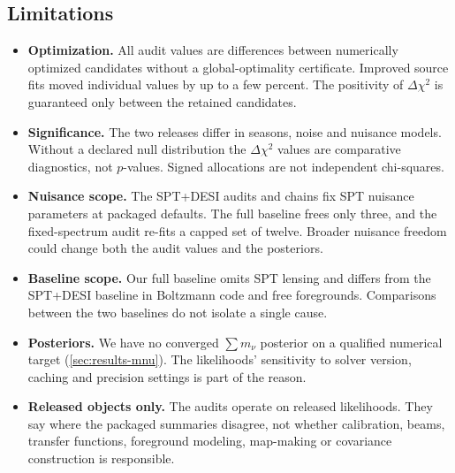 \documentclass[11pt]{article}
\theoremstyle{remark}
\newcommand{\dchi}{\Delta \chi^2}
\newcommand{\mnu}{\sum m_\nu}
\numberwithin{equation}{section}
\begin{document}
\subsection{Limitations}
\begin{itemize}[leftmargin=*, itemsep=2pt]
  \item \textbf{Optimization.} All audit values are differences between numerically optimized candidates without a global-optimality certificate. Improved source fits moved individual values by up to a few percent. The positivity of $\dchi$ is guaranteed only between the retained candidates.
  \item \textbf{Significance.} The two releases differ in seasons, noise and nuisance models. Without a declared null distribution the $\dchi$ values are comparative diagnostics, not $p$-values. Signed allocations are not independent chi-squares.
  \item \textbf{Nuisance scope.} The SPT+DESI audits and chains fix SPT nuisance parameters at packaged defaults. The full baseline frees only three, and the fixed-spectrum audit re-fits a capped set of twelve. Broader nuisance freedom could change both the audit values and the posteriors.
  \item \textbf{Baseline scope.} Our full baseline omits SPT lensing and differs from the SPT+DESI baseline in Boltzmann code and free foregrounds. Comparisons between the two baselines do not isolate a single cause.
  \item \textbf{Posteriors.} We have no converged $\mnu$ posterior on a qualified numerical target (\cref{sec:results-mnu}). The likelihoods' sensitivity to solver version, caching and precision settings is part of the reason.
  \item \textbf{Released objects only.} The audits operate on released likelihoods. They say where the packaged summaries disagree, not whether calibration, beams, transfer functions, foreground modeling, map-making or covariance construction is responsible.
\end{itemize}
\end{document}
